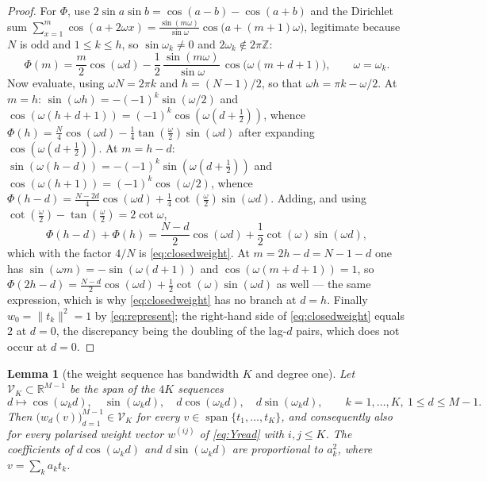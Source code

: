 \documentclass[11pt,a4paper]{article}
\theoremstyle{plain}
\newtheorem{lemma}[theorem]{Lemma}
\theoremstyle{definition}
\newcommand{\R}{\mathbb{R}}
\newcommand{\Z}{\mathbb{Z}}
\begin{document}
\begin{proof}
For $\Phi$, use $2\sin a\sin b=\cos(a-b)-\cos(a+b)$ and the Dirichlet sum
$\sum_{x=1}^{m}\cos(a+2\omega x)
=\frac{\sin(m\omega)}{\sin\omega}\cos\bigl(a+(m+1)\omega\bigr)$, legitimate
because $N$ is odd and $1\le k\le h$, so $\sin\omega_k\ne0$ and
$2\omega_k\notin2\pi\Z$:
\begin{equation}
\label{eq:Phi}
  \Phi(m)=\frac m2\cos(\omega d)
  -\frac12\,\frac{\sin(m\omega)}{\sin\omega}\,
  \cos\bigl(\omega(m+d+1)\bigr),
  \qquad\omega=\omega_k .
\end{equation}
Now evaluate, using $\omega N=2\pi k$ and $h=(N-1)/2$, so that
$\omega h=\pi k-\omega/2$. At $m=h$: $\sin(\omega h)=-(-1)^k\sin(\omega/2)$ and
$\cos(\omega(h+d+1))=(-1)^k\cos(\omega(d+\tfrac12))$, whence
$\Phi(h)=\tfrac N4\cos(\omega d)-\tfrac14\tan(\tfrac\omega2)\sin(\omega d)$
after expanding $\cos(\omega(d+\tfrac12))$. At $m=h-d$:
$\sin(\omega(h-d))=-(-1)^k\sin(\omega(d+\tfrac12))$ and
$\cos(\omega(h+1))=(-1)^k\cos(\omega/2)$, whence
$\Phi(h-d)=\tfrac{N-2d}4\cos(\omega d)
+\tfrac14\cot(\tfrac\omega2)\sin(\omega d)$. Adding, and using
$\cot(\tfrac\omega2)-\tan(\tfrac\omega2)=2\cot\omega$,
\[
  \Phi(h-d)+\Phi(h)=\frac{N-d}2\cos(\omega d)
  +\frac12\cot(\omega)\sin(\omega d),
\]
which with the factor $4/N$ is \eqref{eq:closedweight}. At $m=2h-d=N-1-d$ one
has $\sin(\omega m)=-\sin(\omega(d+1))$ and $\cos(\omega(m+d+1))=1$, so
$\Phi(2h-d)=\tfrac{N-d}2\cos(\omega d)+\tfrac12\cot(\omega)\sin(\omega d)$ as
well --- the same expression, which is why \eqref{eq:closedweight} has no branch
at $d=h$. Finally $w_0=\lVert t_k\rVert^{2}=1$ by \eqref{eq:represent}; the
right-hand side of \eqref{eq:closedweight} equals $2$ at $d=0$, the discrepancy
being the doubling of the lag-$d$ pairs, which does not occur at $d=0$.
\end{proof}

\begin{lemma}[the weight sequence has bandwidth $K$ and degree one]
\label{lem:band}
Let $\mathcal V_K\subset\R^{M-1}$ be the span of the $4K$ sequences
\begin{equation}
\label{eq:bandspace}
  d\mapsto\cos(\omega_kd),\quad \sin(\omega_kd),\quad
  d\cos(\omega_kd),\quad d\sin(\omega_kd),
  \qquad k=1,\dots,K,\ 1\le d\le M-1 .
\end{equation}
Then $\bigl(w_d(v)\bigr)_{d=1}^{M-1}\in\mathcal V_K$ for every
$v\in\operatorname{span}\{t_1,\dots,t_K\}$, and consequently also for every
polarised weight vector $w^{(ij)}$ of \eqref{eq:Yread} with $i,j\le K$. The
coefficients of $d\cos(\omega_kd)$ and $d\sin(\omega_kd)$ are proportional to
$a_k^{2}$, where $v=\sum_ka_kt_k$.
\end{lemma}
\end{document}

